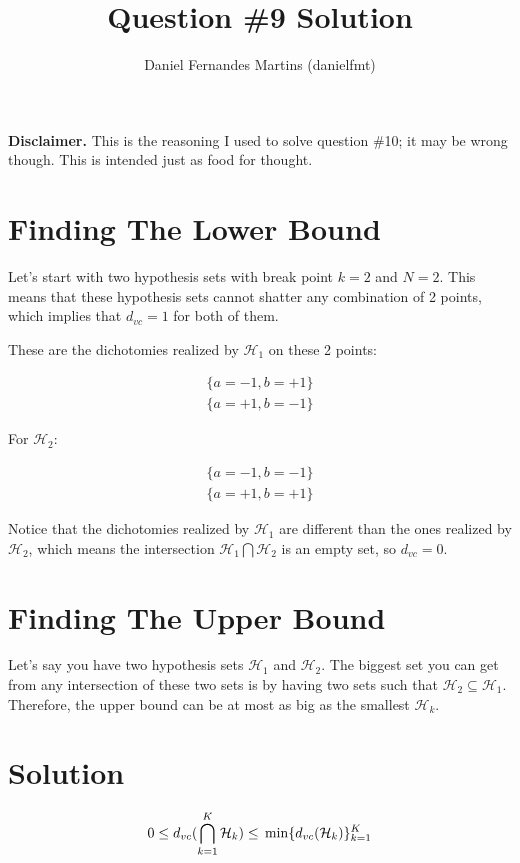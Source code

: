 \documentclass{article}
\author{Daniel Fernandes Martins (danielfmt)}
\title{Question \#9 Solution}
\begin{document}
\maketitle

\textbf{Disclaimer.} This is the reasoning I used to solve question \#10; it
may be wrong though. This is intended just as food for thought.

\section{Finding The Lower Bound}

Let's start with two hypothesis sets with break point $k=2$ and $N=2$. This
means that these hypothesis sets cannot shatter any combination of 2 points,
which implies that $d_{vc}=1$ for both of them.

These are the dichotomies realized by $\mathcal{H}_1$ on these 2 points:

\begin{equation*}
\begin{split}
\{a=-1, b=+1\} \\
\{a=+1, b=-1\}
\end{split}
\end{equation*}

For $\mathcal{H}_2$:

\begin{equation*}
\begin{split}
\{a=-1, b=-1\} \\
\{a=+1, b=+1\}
\end{split}
\end{equation*}

Notice that the dichotomies realized by $\mathcal{H}_1$ are different than the
ones realized by $\mathcal{H}_2$, which means the intersection
$\mathcal{H}_1\bigcap\mathcal{H}_2$ is an empty set, so $d_{vc}=0$.

\section{Finding The Upper Bound}

Let's say you have two hypothesis sets $\mathcal{H}_1$ and $\mathcal{H}_2$. The
biggest set you can get from any intersection of these two sets is by having
two sets such that $\mathcal{H}_2\subseteq\mathcal{H}_1$. Therefore, the upper
bound can be at most as big as the smallest $\mathcal{H}_k$.

\section{Solution}

\begin{equation*}
0 \leq \\
  d_{vc}(\bigcap_{k=1}^K\mathcal{H}_k) \leq \\
  \min\{d_{vc}(\mathcal{H}_k)\}_{k=1}^K
\end{equation*}
\end{document}
